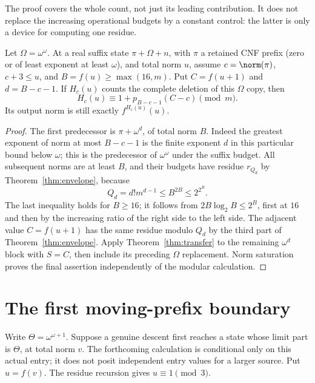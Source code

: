 \documentclass[11pt]{article}
\begin{document}
The proof covers the whole count, not just its leading contribution.
It does not replace the increasing operational budgets by a constant
control: the latter is only a device for computing one residue.

\begin{proposition}\label{prop:omega-block}
Let $\Omega=\omega^\omega$. At a real suffix state $\pi+\Omega+n$, with $\pi$ a retained CNF
prefix (zero or of least exponent at least $\omega$), and total norm $u$,
assume $c=\norm(\pi)$, $c+3\le u$, and
$B=f(u)\ge\max(16,m)$. Put $C=f(u+1)$ and $d=B-c-1$.
If $H_c(u)$ counts the complete deletion of this $\Omega$ copy,
then
\begin{equation}\label{eq:omega-block}
 H_c(u)\equiv1+p_{B-c-1}(C-c)\pmod m.
\end{equation}
Its output norm is still exactly $f^{H_c(u)}(u)$.
\end{proposition}
\begin{proof}
The first predecessor is $\pi+\omega^d$, of total norm $B$.
Indeed the greatest exponent of norm at most $B-c-1$ is the
finite exponent $d$ in this particular bound below $\omega$;
this is the predecessor of $\omega^\omega$ under the suffix budget.
All subsequent norms are at least $B$, and their budgets have
residue $r_{Q_d}$ by Theorem~\ref{thm:envelope}, because
\[
 Q_d=d!m^{d-1}\le B^{2B}\le2^{2^B}.
\]
The last inequality holds for $B\ge16$; it follows from
$2B\log_2 B\le2^B$, first at $16$ and then by the increasing
ratio of the right side to the left side.
The adjacent value $C=f(u+1)$ has the same residue modulo $Q_d$
by the third part of Theorem~\ref{thm:envelope}.
Apply Theorem~\ref{thm:transfer} to the remaining $\omega^d$ block
with $S=C$, then include its preceding $\Omega$ replacement.
Norm saturation proves the final assertion independently of the
modular calculation.
\end{proof}

\section{The first moving-prefix boundary}

Write $\Theta=\omega^{\omega+1}$. Suppose a genuine descent first
reaches a state whose limit part is $\Theta$, at total norm $v$.
The forthcoming calculation is conditional only on this actual
entry; it does not posit independent entry values for a larger source.
Put $u=f(v)$. The residue recursion gives $u\equiv1\pmod3$.
\end{document}
